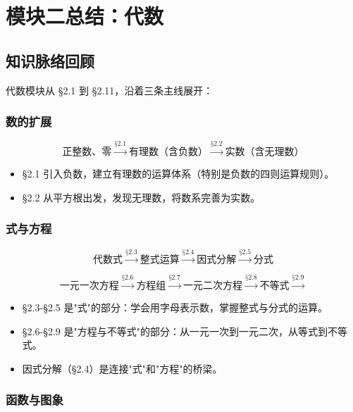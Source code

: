 \chapter*{模块二总结：代数}


\section*{知识脉络回顾}


代数模块从 §2.1 到 §2.11，沿着三条主线展开：

\subsection*{数的扩展}


\[
\text{正整数、零} \xrightarrow{\text{§2.1}} \text{有理数（含负数）} \xrightarrow{\text{§2.2}} \text{实数（含无理数）}
\]


\begin{itemize}
  \item §2.1 引入负数，建立有理数的运算体系（特别是负数的四则运算规则）。
  \item §2.2 从平方根出发，发现无理数，将数系完善为实数。
\end{itemize}


\subsection*{式与方程}


\[
\text{代数式} \xrightarrow{\text{§2.3}} \text{整式运算} \xrightarrow{\text{§2.4}} \text{因式分解} \xrightarrow{\text{§2.5}} \text{分式}
\]


\[
\text{一元一次方程} \xrightarrow{\text{§2.6}} \text{方程组} \xrightarrow{\text{§2.7}} \text{一元二次方程} \xrightarrow{\text{§2.8}} \text{不等式} \xrightarrow{\text{§2.9}}
\]


\begin{itemize}
  \item §2.3-§2.5 是"式"的部分：学会用字母表示数，掌握整式与分式的运算。
  \item §2.6-§2.9 是"方程与不等式"的部分：从一元一次到一元二次，从等式到不等式。
  \item 因式分解（§2.4）是连接"式"和"方程"的桥梁。
\end{itemize}


\subsection*{函数与图象}


